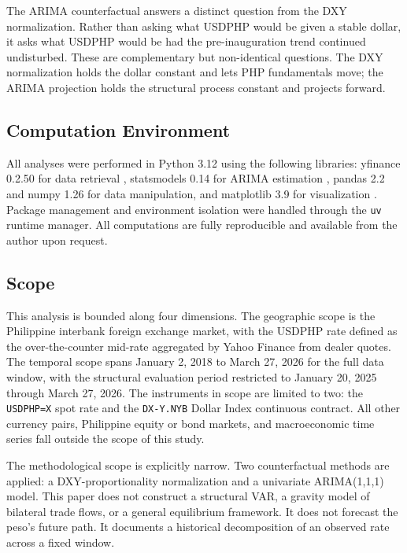 \documentclass[12pt]{article}
\begin{document}
The ARIMA counterfactual answers a distinct question from the DXY normalization. 
Rather than asking what USDPHP would be given a stable dollar, it asks what USDPHP
would be had the pre-inauguration trend continued undisturbed. These are
complementary but non-identical questions. The DXY normalization holds the dollar
constant and lets PHP fundamentals move; the ARIMA projection holds the structural
process constant and projects forward.

\subsection{Computation Environment}

All analyses were performed in Python 3.12 using the following libraries: yfinance
0.2.50 for data retrieval \citep{yahoophp2026, yahoodxy2026}, statsmodels 0.14 for
ARIMA estimation \citep{seabold2010}, pandas 2.2 and numpy 1.26 for data
manipulation, and matplotlib 3.9 for visualization \citep{hunter2007}. Package
management and environment isolation were handled through the \texttt{uv}
runtime
manager. All computations are fully reproducible and available from the author upon request.

\subsection{Scope}

This analysis is bounded along four dimensions. The geographic scope is the Philippine
interbank foreign exchange market, with the USDPHP rate defined as the over-the-counter
mid-rate aggregated by Yahoo Finance from dealer quotes. The temporal scope spans
January 2, 2018 to March 27, 2026 for the full data window, with the structural
evaluation period restricted to January 20, 2025 through March 27, 2026. The
instruments in scope are limited to two: the \texttt{USDPHP=X} spot rate and the
\texttt{DX-Y.NYB} Dollar Index continuous contract. All other currency pairs,
Philippine equity or bond markets, and macroeconomic time series fall outside the
scope of this study.

The methodological scope is explicitly narrow. Two counterfactual methods are applied: 
a DXY-proportionality normalization and a univariate ARIMA(1,1,1) model. This paper
does not construct a structural VAR, a gravity model of bilateral trade flows, or a
general equilibrium framework. It does not forecast the peso's future path. It
documents a historical decomposition of an observed rate across a fixed window.
\end{document}
